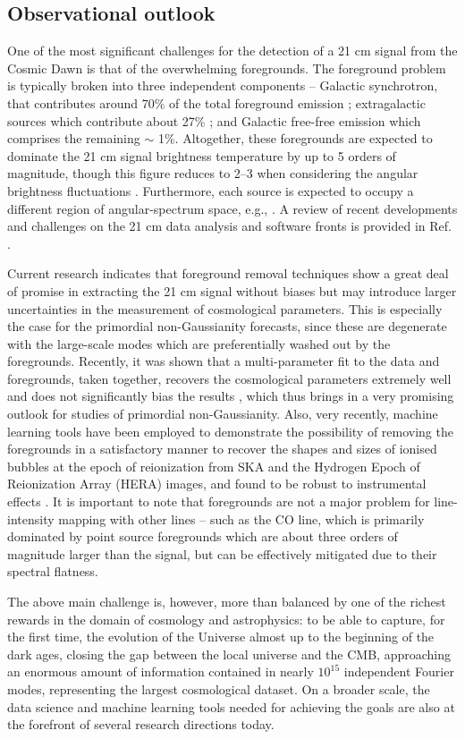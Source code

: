 
\subsection{Observational outlook}
\label{s:results}

One of the most significant challenges for the  detection of a 21 cm signal from the Cosmic Dawn is that of the overwhelming foregrounds. The foreground problem is typically broken into three independent components – Galactic synchrotron, that contributes around 70\% of the total foreground emission \cite{shaver1999}; extragalactic sources which contribute about 27\% \cite{mellema2013}; and Galactic free-free emission which comprises the remaining $\sim$ 1\%. Altogether, these foregrounds are expected to dominate the 21 cm signal brightness temperature by up to 5 orders of magnitude, though this figure reduces to 2–3 when considering the angular brightness fluctuations \cite{bernardi2009}. Furthermore, each source is expected to occupy a different region of angular-spectrum space, e.g., \cite{chapman2016}. A review of recent developments and challenges on the 21 cm data analysis and software fronts is provided in Ref. \cite{liu2020a}.

Current research indicates that foreground removal techniques show a great deal of promise in extracting the 21 cm signal without biases but may introduce larger uncertainties in the measurement of cosmological parameters. This is especially the case for the primordial non-Gaussianity forecasts, since these are degenerate with the large-scale modes which are preferentially washed out by the foregrounds. Recently, it was shown that a multi-parameter fit to the data and foregrounds, taken together, recovers the cosmological parameters extremely well and does not significantly bias the results \cite{fonseca2020}, which thus brings in a very promising outlook for studies of primordial non-Gaussianity. Also, very recently, machine learning tools have been employed to demonstrate the possibility of removing the foregrounds in a satisfactory manner to recover the shapes and sizes of ionised bubbles at the epoch of reionization from SKA and the Hydrogen Epoch of Reionization Array (HERA) images, and found to be robust to instrumental effects \cite{gagnon2021}. It is important to note that foregrounds are not a major problem for line-intensity mapping with other lines -- such as the CO line, which is primarily dominated by point source foregrounds \cite{keating2016} which are about three orders of magnitude larger than the signal, but can be effectively mitigated due to their spectral flatness.

The above main challenge is, however, more than balanced by one of the richest rewards in the domain of cosmology and astrophysics: to be able to capture, for the first time, the evolution of the Universe almost up to the beginning of the dark ages, closing the gap between the local universe and the CMB, approaching an enormous amount of information contained in nearly $10^{15}$ independent Fourier modes, representing the largest cosmological dataset.
 On a broader scale, the data science and machine learning tools needed for achieving the goals are also at the forefront of several research directions today. 

